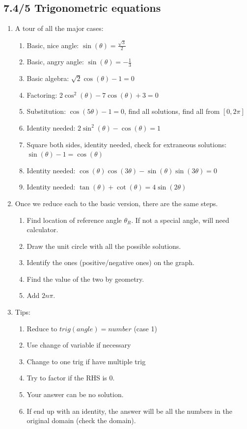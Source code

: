 \documentclass{article}
\newcommand{\ds}{\displaystyle}
\begin{document}
\subsection{7.4/5 Trigonometric equations}
\begin{enumerate}

\item A tour of all the major cases:
\begin{enumerate}
\item Basic, nice angle: $\ds \sin(\theta) = \frac{\sqrt{3}}{2}$
\item Basic, angry angle: $\ds \sin(\theta) = -\frac{1}{3}$
\item Basic algebra: $\ds \sqrt{2}\cos(\theta) - 1 = 0$
\item Factoring: $\ds 2\cos^2(\theta) - 7\cos(\theta)+3=0$
\item Substitution: $\ds \cos(5\theta)-1=0$, find all solutions, find all from $[0,2\pi]$
\item Identity needed: $\ds 2\sin^2(\theta)-\cos(\theta)=1$
\item Square both sides, identity needed, check for extraneous solutions: $\ds \sin(\theta)-1=\cos(\theta)$
\item Identity needed: $\ds \cos(\theta)\cos(3\theta) - \sin(\theta)\sin(3\theta) = 0$
\item Identity needed: $\ds \tan(\theta)+\cot(\theta)=4\sin(2\theta)$
\end{enumerate}


\item Once we reduce each to the basic version, there are the same steps.
\begin{enumerate}
\item Find location of reference angle $\theta_R$. If not a special angle, will need calculator.
\item Draw the unit circle with all the possible solutions.
\item Identify the ones (positive/negative ones) on the graph.
\item Find the value of the two by geometry.
\item Add $2n\pi$.
\end{enumerate}

\item Tips:
\begin{enumerate}
\item Reduce to $trig(angle) = number$ (case 1)
\item Use change of variable if necessary
\item Change to one trig if have multiple trig
\item Try to factor if the RHS is 0.
\item Your answer can be no solution.
\item If end up with an identity, the answer will be all the numbers in the original domain (check the domain). 
\end{enumerate}
\end{enumerate}
\end{document}
